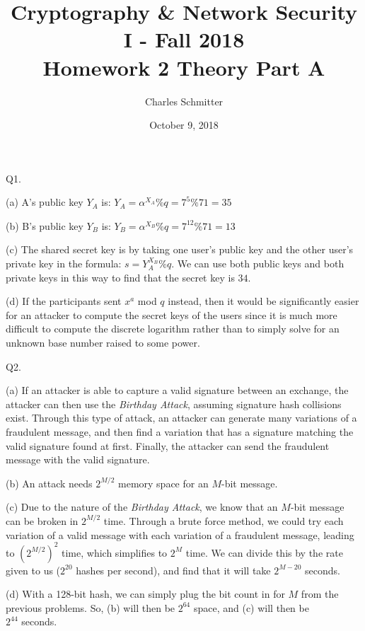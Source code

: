 \documentclass[11pt]{article}
\title{Cryptography \& Network Security I - Fall 2018\\ \large Homework 2 Theory Part A}
\author{Charles Schmitter}
\date{October 9, 2018}
\newcommand{\gap}{\vspace{3mm}}
\newcommand{\bigGap}{\vspace{10mm}}
\begin{document}
\maketitle

Q1. 

\gap{}

(a) A's public key $Y_A$ is: $Y_A = \alpha^{X_A}\%q=7^5\%71=35$

(b) B's public key $Y_B$ is: $Y_B = \alpha^{X_B}\%q=7^12\%71=13$

(c) The shared secret key is by taking one user's public key and the other user's private key in the formula: $s=Y_A^{X_B}\%q$. We can use both public keys and both private keys in this way to find that the secret key is $34$.

(d) If the participants sent $x^a$ mod $q$ instead, then it would be significantly easier for an attacker to compute the secret keys of the users since it is much more difficult to compute the discrete logarithm rather than to simply solve for an unknown base number raised to some power.

\bigGap{}

Q2. 

\gap{}

(a) If an attacker is able to capture a valid signature between an exchange, the attacker can then use the \textit{Birthday Attack}, assuming signature hash collisions exist. Through this type of attack, an attacker can generate many variations of a fraudulent message, and then find a variation that has a signature matching the valid signature found at first. Finally, the attacker can send the fraudulent message with the valid signature.

(b) An attack needs $2^{M/2}$ memory space for an $M$-bit message.

(c) Due to the nature of the \textit{Birthday Attack}, we know that an $M$-bit message can be broken in $2^{M/2}$ time. Through a brute force method, we could try each variation of a valid message with each variation of a fraudulent message, leading to $(2^{M/2})^2$ time, which simplifies to $2^M$ time. We can divide this by the rate given to us ($2^20$ hashes per second), and find that it will take $2^{M-20}$ seconds.

(d) With a 128-bit hash, we can simply plug the bit count in for $M$ from the previous problems. So, (b) will then be $2^64$ space, and (c) will then be\\
$2^{44}$ seconds.

\bigGap{}
\end{document}
